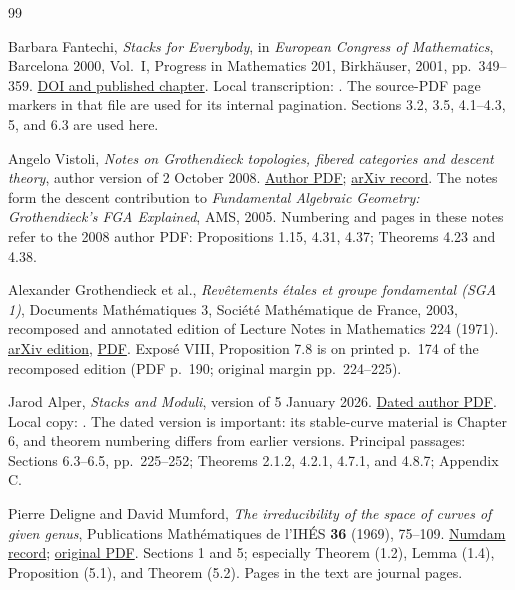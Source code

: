 \begin{thebibliography}{99}
\raggedright

Barbara Fantechi, \emph{Stacks for Everybody}, in
\emph{European Congress of Mathematics}, Barcelona 2000, Vol.~I,
Progress in Mathematics 201, Birkh\"auser, 2001, pp.~349--359.
\href{https://doi.org/10.1007/978-3-0348-8268-2_20}{DOI and published chapter}.
Local transcription: .
The source-PDF page markers in that file are used for its internal
pagination. Sections 3.2, 3.5, 4.1--4.3, 5, and 6.3 are used here.

Angelo Vistoli, \emph{Notes on Grothendieck topologies, fibered
categories and descent theory}, author version of 2 October 2008.
\href{https://homepage.sns.it/vistoli/descent.pdf}{Author PDF};
\href{https://arxiv.org/abs/math/0412512}{arXiv record}.
The notes form the descent contribution to \emph{Fundamental
Algebraic Geometry: Grothendieck's FGA Explained}, AMS, 2005.
Numbering and pages in these notes refer to the 2008 author PDF:
Propositions 1.15, 4.31, 4.37; Theorems 4.23 and 4.38.

Alexander Grothendieck et al., \emph{Rev\^etements \'etales et groupe
fondamental (SGA 1)}, Documents Math\'ematiques 3, Soci\'et\'e
Math\'ematique de France, 2003, recomposed and annotated edition
of Lecture Notes in Mathematics 224 (1971).
\href{https://arxiv.org/abs/math/0206203}{arXiv edition},
\href{https://arxiv.org/pdf/math/0206203}{PDF}.
Expos\'e VIII, Proposition 7.8 is on printed p.~174 of the
recomposed edition (PDF p.~190; original margin pp.~224--225).

Jarod Alper, \emph{Stacks and Moduli}, version of 5 January 2026.
\href{https://sites.math.washington.edu/~jarod/moduli-versions/moduli-1-5-26.pdf}{Dated author PDF}.
Local copy: .
The dated version is important: its stable-curve material is
Chapter 6, and theorem numbering differs from earlier versions.
Principal passages: Sections 6.3--6.5, pp.~225--252;
Theorems 2.1.2, 4.2.1, 4.7.1, and 4.8.7; Appendix C.

Pierre Deligne and David Mumford, \emph{The irreducibility of the
space of curves of given genus}, Publications Math\'ematiques
de l'IH\'ES \textbf{36} (1969), 75--109.
\href{https://www.numdam.org/item/PMIHES_1969__36__75_0/}{Numdam record};
\href{https://www.numdam.org/item/PMIHES_1969__36__75_0.pdf}{original PDF}.
Sections 1 and 5; especially Theorem (1.2), Lemma (1.4),
Proposition (5.1), and Theorem (5.2). Pages in the text are
journal pages.


\end{thebibliography}
